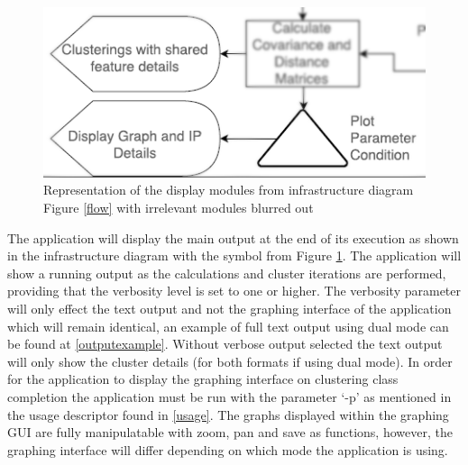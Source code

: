 \begin{figure}[!h]
\centering
\includegraphics{./Figures/display.png}
\caption{Representation of the display modules from infrastructure diagram Figure \ref{flow} with irrelevant modules blurred out}
\label{display}
\end{figure}

The application will display the main output at the end of its execution as shown in the infrastructure diagram with the symbol from Figure \ref{display}. The application will show a running output as the calculations and cluster iterations are performed, providing that the verbosity level is set to one or higher. The verbosity parameter will only effect the text output and not the graphing interface of the application which will remain identical, an example of full text output using dual mode can be found at \ref{outputexample}. Without verbose output selected the text output will only show the cluster details (for both formats if using dual mode). In order for the application to display the graphing interface on clustering class completion the application must be run with the parameter ‘-p’ as mentioned in the usage descriptor found in \ref{usage}. The graphs displayed within the graphing GUI are fully manipulatable with zoom, pan and save as functions, however, the graphing interface will differ depending on which mode the application is using. \linebreak
